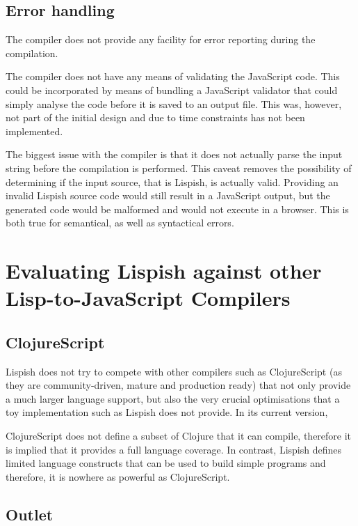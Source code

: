 \subsection{Error handling}
The compiler does not provide any facility for error reporting during the compilation.

The compiler does not have any means of validating the JavaScript code. This could be incorporated by means of bundling a JavaScript validator that could simply analyse the code before it is saved to an output file. This was, however, not part of the initial design and due to time constraints has not been implemented.

The biggest issue with the compiler is that it does not actually parse the input string before the compilation is performed. This caveat removes the possibility of determining if the input source, that is Lispish, is actually valid. 
Providing an invalid Lispish source code would still result in a JavaScript output, but the generated code would be malformed and would not execute in a browser. This is both true for semantical, as well as syntactical errors.

\section{Evaluating Lispish against other Lisp-to-JavaScript Compilers}\label{lispish-vs-rest}

\subsection{ClojureScript}

Lispish does not try to compete with other compilers such as ClojureScript (as they are community-driven, mature and production ready) that not only provide a much larger language support, but also the very crucial optimisations that a toy implementation such as Lispish does not provide. In its current version, 

ClojureScript does not define a subset of Clojure that it can compile, therefore it is implied that it provides a full language coverage. In contrast, Lispish defines limited language constructs that can be used to build simple programs and therefore, it is nowhere as powerful as ClojureScript.

\subsection{Outlet}

